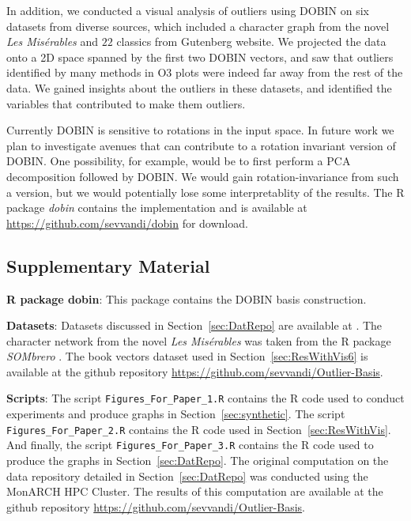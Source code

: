 \documentclass[a4paper,12pt]{article}
\begin{document}
In addition, we conducted a visual analysis of outliers using DOBIN on six datasets from diverse sources, which included a character graph from the novel \textit{Les Mis\'erables} and $22$ classics from Gutenberg website. We projected the data onto a 2D space spanned by the first two DOBIN vectors, and saw that outliers identified by many methods in O3 plots were indeed far away from the rest of the data. We gained insights about the outliers in these datasets, and identified the variables that contributed to make them outliers.


Currently DOBIN is sensitive to rotations in the input space. In future work we plan to investigate avenues that can contribute to a rotation invariant version of DOBIN. One possibility, for example, would be to first perform a PCA decomposition followed by DOBIN. We would gain rotation-invariance from such a version, but we would potentially lose some interpretablity of the results. The R package \textit{dobin} contains the implementation and is available at \url{https://github.com/sevvandi/dobin} for download.

\subsection*{Supplementary Material}

\textbf{R package dobin}: This package contains the DOBIN basis construction.

\textbf{Datasets}: Datasets discussed in Section~\ref{sec:DatRepo} are available at \cite{datasets}. The character network from the novel \textit{Les Mis\'erables} was taken from the R package \textit{SOMbrero} \citep{sombrero}. The book vectors dataset used in Section~\ref{sec:ResWithVis6} is available at the github repository \url{https://github.com/sevvandi/Outlier-Basis}.

\textbf{Scripts}: The script \texttt{Figures\_For\_Paper\_1.R} contains the R code used to conduct experiments and produce graphs in Section~\ref{sec:synthetic}. The script \texttt{Figures\_For\_Paper\_2.R} contains the R code used in Section~\ref{sec:ResWithVis}. And finally, the script \texttt{Figures\_For\_Paper\_3.R} contains the R code used to produce the graphs in Section~\ref{sec:DatRepo}. The original computation on the data repository detailed in Section~\ref{sec:DatRepo} was conducted using the MonARCH HPC Cluster. The results of this computation are available at the github repository \url{https://github.com/sevvandi/Outlier-Basis}.
\end{document}
